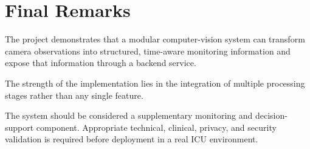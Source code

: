 \documentclass{tietreport}
\begin{document}

\section{Final Remarks}

The project demonstrates that a modular computer-vision system can
transform camera observations into structured, time-aware monitoring
information and expose that information through a backend service.

The strength of the implementation lies in the integration of multiple
processing stages rather than any single feature.

The system should be considered a supplementary monitoring and
decision-support component. Appropriate technical, clinical, privacy,
and security validation is required before deployment in a real ICU
environment.


\printbibliography[
    heading=bibintoc,
    title={Bibliography}
]

\end{document}
